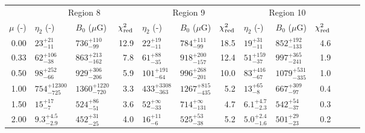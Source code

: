 \begin{tabular}{@{}r llr llr llr llr@{}}
\cmidrule{1-13}
{} & \multicolumn{3}{c}{Region 8}
   & \multicolumn{3}{c}{Region 9}
   & \multicolumn{3}{c}{Region 10} \\
\cmidrule(lr){2-4} \cmidrule(lr){5-7} \cmidrule(lr){8-10}
$\mu$ (-) & $\eta_2$ (-) & $B_0$ ($\mu$G) & $\chi^2_{\mathrm{red}}$
          & $\eta_2$ (-) & $B_0$ ($\mu$G) & $\chi^2_{\mathrm{red}}$
          & $\eta_2$ (-) & $B_0$ ($\mu$G) & $\chi^2_{\mathrm{red}}$ \\
\cmidrule{1-10}
0.00 & ${23}^{+21}_{-11}$ & ${736}^{+110}_{-99}$ & 12.9
     & ${22}^{+19}_{-11}$ & ${784}^{+111}_{-99}$ & 18.5
     & ${19}^{+31}_{-11}$ & ${852}^{+192}_{-133}$ & 4.6 \\
0.33 & ${62}^{+106}_{-38}$ & ${863}^{+213}_{-162}$ & 7.8
     & ${61}^{+88}_{-35}$ & ${918}^{+200}_{-157}$ & 12.4
     & ${51}^{+159}_{-37}$ & ${997}^{+365}_{-241}$ & 1.9 \\
0.50 & ${98}^{+252}_{-66}$ & ${929}^{+306}_{-206}$ & 5.9
     & ${101}^{+191}_{-64}$ & ${996}^{+268}_{-201}$ & 10.0
     & ${83}^{+416}_{-67}$ & ${1079}^{+531}_{-335}$ & 1.0 \\
1.00 & ${754}^{+12300}_{-725}$ & ${1360}^{+1220}_{-720}$ & 3.3
     & ${433}^{+3308}_{-363}$ & ${1267}^{+815}_{-435}$ & 5.2
     & ${13}^{+65}_{-8}$ & ${667}^{+309}_{-97}$ & 0.4 \\
1.50 & ${15}^{+17}_{-7}$ & ${524}^{+86}_{-51}$ & 3.6
     & ${52}^{+\infty}_{-33}$ & ${714}^{+\infty}_{-131}$ & 4.7
     & ${6.1}^{+4.7}_{-2.3}$ & ${542}^{+54}_{-37}$ & 0.3 \\
2.00 & ${9.3}^{+4.5}_{-2.9}$ & ${452}^{+31}_{-25}$ & 4.0
     & ${16}^{+11}_{-6}$ & ${525}^{+53}_{-38}$ & 5.2
     & ${5.0}^{+2.4}_{-1.6}$ & ${501}^{+29}_{-23}$ & 0.2 \\

\bottomrule
\end{tabular}
